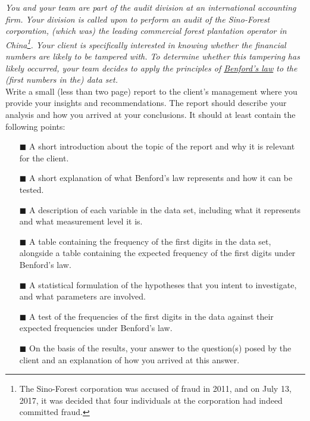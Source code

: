 \textit{You and your team are part of the audit division at an international accounting firm. Your division is called upon to perform an audit of the Sino-Forest corporation, (which was) the leading commercial forest plantation operator in China\footnote{The Sino-Forest corporation was accused of fraud in 2011, and on July 13, 2017, it was decided that four individuals at the corporation had indeed committed fraud.}. Your client is specifically interested in knowing whether the financial numbers are likely to be tampered with. To determine whether this tampering has likely occurred, your team decides to apply the principles of \href{https://en.wikipedia.org/wiki/Benford\%27s_law}{Benford's law} to the (first numbers in the) data set.} \\

Write a small (less than two page) report to the client's management where you provide your insights and recommendations. The report should describe your analysis and how you arrived at your conclusions. It should at least contain the following points: \\

\begin{itemize}
    \item[$\blacksquare$] A short introduction about the topic of the report and why it is relevant for the client.
    \item[$\blacksquare$] A short explanation of what Benford's law represents and how it can be tested. 
    \item[$\blacksquare$] A description of each variable in the data set, including what it represents and what measurement level it is. 
    \item[$\blacksquare$] A table containing the frequency of the first digits in the data set, alongside a table containing the expected frequency of the first digits under Benford's law.
    \item[$\blacksquare$] A statistical formulation of the hypotheses that you intent to investigate, and what parameters are involved.
    \item[$\blacksquare$] A test of the frequencies of the first digits in the data against their expected frequencies under Benford's law.
    \item[$\blacksquare$] On the basis of the results, your answer to the question(s) posed by the client and an explanation of how you arrived at this answer.
\end{itemize}

\clearpage %